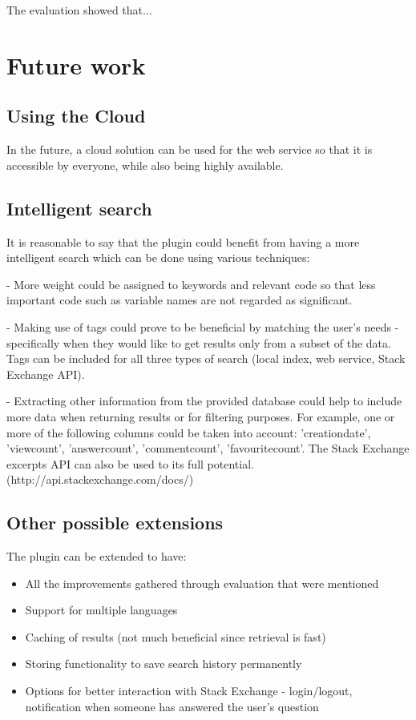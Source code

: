 \documentclass{l4proj}
\begin{document}
The evaluation showed that...

\section{Future work}

\subsection{Using the Cloud}
In the future, a cloud solution can be used for the web service so that it is accessible by everyone, while also being highly available. 

\subsection{Intelligent search}
It is reasonable to say that the plugin could benefit from having a more intelligent search which can be done using various techniques:

- More weight could be assigned to keywords and relevant code so that less important code such as variable names are not regarded as significant. 

- Making use of tags could prove to be beneficial by matching the user's needs - specifically when they would like to get results only from a subset of the data. Tags can be included for all three types of search (local index, web service, Stack Exchange API).

- Extracting other information from the provided database could help to include more data when returning results or for filtering purposes. For example, one or more of the following columns could be taken into account: 'creationdate', 'viewcount', 'answercount', 'commentcount', 'favouritecount'. The Stack Exchange excerpts API can also be used to its full potential. (http://api.stackexchange.com/docs/)

\subsection{Other possible extensions}
The plugin can be extended to have:

\begin{itemize}
\item All the improvements gathered through evaluation that were mentioned
\item Support for multiple languages
\item Caching of results (not much beneficial since retrieval is fast)
\item Storing functionality to save search history permanently
\item Options for better interaction with Stack Exchange - login/logout, notification when someone has answered the user's question
\end{itemize}
\end{document}
